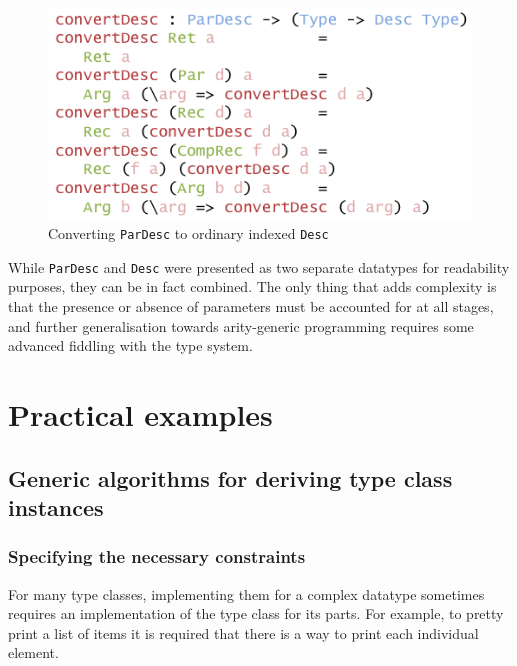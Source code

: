 \documentclass{ituthesis}
\newcommand{\tttype}[1]{\textcolor{type-color}{\texttt{#1}}}
\theoremstyle{break}
\begin{document}
\begin{figure}[ht]
\begin{center}
    \includegraphics[scale=0.5]{Figures/ParDescriptionConversion.png}
\end{center}
\caption{Converting \tttype{ParDesc} to ordinary indexed \tttype{Desc}}
\label{fig:pardesctodesc}
\end{figure}

While \tttype{ParDesc} and \tttype{Desc} were presented as two separate datatypes for readability purposes, they can be in fact combined.
The only thing that adds complexity is that the presence or absence of parameters must be accounted for at all stages, and further generalisation towards arity-generic programming requires some advanced fiddling with the type system.


\chapter{Practical examples}
\label{cha:PracticalExamples}

\section{Generic algorithms for deriving type class instances}
\label{sec:Genericalgorithmsforderivingtypeclassinstances}

\subsection{Specifying the necessary constraints}
\label{sub:Specifying the necessary constraints}

For many type classes, implementing them for a complex datatype sometimes requires an implementation of the type class for its parts.
For example, to pretty print a list of items it is required that there is a way to print each individual element.
\end{document}
